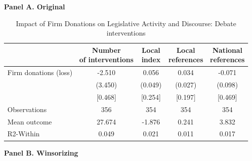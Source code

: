 \documentclass[12pt,a4paper]{article}
\begin{document}
\begin{table}[H]
\caption{Impact of Firm Donations on Legislative Activity and Discourse: Debate interventions}
\label{tab:interventions}

\bigskip
\textbf{Panel A. Original}\\[1mm]

{
\def\sym#1{\ifmmode^{#1}\else\(^{#1}\)\fi}
\begin{tabular}{lcccc}
\hline\hline
                & \shortstack{Number\\of interventions}
                & \shortstack{Local\\index}
                & \shortstack{Local\\references}
                & \shortstack{National\\references} \\
\hline
Firm donations (loss)
                &   -2.510        &    0.056        &    0.034        &   -0.071        \\
                &   (3.450)       &   (0.049)       &   (0.027)       &   (0.098)       \\
                &   [0.468]       &   [0.254]       &   [0.197]       &   [0.469]       \\
Observations    &     356         &     354         &     354         &     354         \\
Mean outcome    &    27.674       &    -1.876       &     0.241       &     3.832       \\
R2-Within       &     0.049       &     0.021       &     0.011       &     0.017       \\
\hline\hline
\end{tabular}
}

\bigskip
\textbf{Panel B. Winsorizing}\\[1mm]


\end{table}
\end{document}
